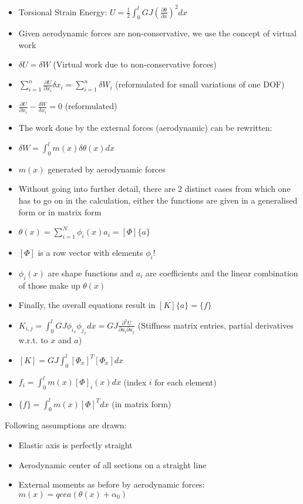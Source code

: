 \documentclass[8pt, landscape, fleqn]{scrartcl}
\begin{document}
\begin{multicols*}{3}
\begin{itemize}
    \item Torsional Strain Energy: $U = \frac{1}{2}\int_0^l GJ (\frac{\partial \theta}{\partial x})^2 dx$
    \item Given aerodynamic forces are non-conservative, we use the concept of virtual work
    \item $\delta U = \delta W$ (Virtual work due to non-conservative forces)
    \item $\sum_{i=1}^n \frac{\partial U}{\partial x_i} \delta x_i = \sum_{i=1}^n \delta W_i$ (reformulated for small variations of one DOF)
    \item $\frac{\partial U}{\partial x_i} - \frac{\delta W}{\delta x_i} = 0$ (reformulated)
    \item The work done by the external forces (aerodynamic) can be rewritten:
    \item $\delta W = \int_0^l m(x) \delta \theta(x) dx$ 
    \item $m(x)$ generated by aerodynamic forces
    \item Without going into further detail, there are 2 distinct cases from which one has to go on in the calculation, either the functions are given in a generalised form or in matrix form
    \item $\theta(x) = \sum_{i=1}^N \phi_i(x)a_i = [\Phi] \{a\}$
    \item $[\Phi]$ is a row vector with elements $\phi_i$!
    \item $\phi_i(x)$ are shape functions and $a_i$ are coefficients and the linear combination of those make up $\theta(x)$
    \item Finally, the overall equations result in $[K] \{a\} = \{f\}$ 
    \item $K_{i,j} = \int_0^l GJ \phi_{i_x} \phi_{j_x} dx = GJ \frac{\partial^2 U}{\partial a_i \partial a_j}$ (Stiffness matrix entries, partial derivatives w.r.t. to $x$ and $a$)
    \item $[K] = GJ \int_0^l [\Phi_x]^T[\Phi_x] dx $
    \item $f_i = \int_0^l m(x) [\Phi]_i(x) dx$ (index $i$ for each element)
    \item $\{f\} = \int_0^l m(x) [\Phi]^T dx$ (in matrix form)
\end{itemize}

Following assumptions are drawn:

\begin{itemize}
    \item Elastic axis is perfectly straight
    \item Aerodynamic center of all sections on a straight line
    \item External moments as before by aerodynamic forces: $m(x) = qcea(\theta(x)+\alpha_0)$
\end{itemize}


\end{multicols*}
\end{document}
